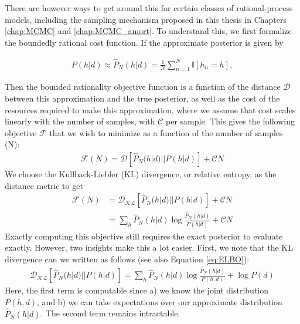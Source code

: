 There are however ways to get around this for certain classes of rational-process models, including the sampling mechanism proposed in this thesis in Chapters \ref{chap:MCMC} and \ref{chap:MCMC_amort}. To understand this, we first formalize the boundedly rational cost function. If the approximate posterior is given by

\begin{align}
P(h|d) \approx \hat{P}_N(h|d) = \frac{1}{N}\sum_{n=1}^N \mathbb{I}[h_n=h],
\end{align}

Then the bounded rationality objective function is a function of the distance $\mathcal{D}$ between this approximation and the true posterior, as well as the cost of the resources required to make this approximation, where we assume that cost scales linearly with the number of samples, with $\mathcal{C}$ per sample. This gives the following objective $\mathcal{F}$ that we wish to minimize as a function of the number of samples (N):
\begin{align}
\mathcal{F}(N) = \mathcal{D}[\hat{P}_N(h|d)||P(h|d)] + \mathcal{C}N
\end{align}
We choose the Kullback-Liebler (KL) divergence, or relative entropy, as the distance metric to get
\begin{align}
\mathcal{F}(N) &= \mathcal{D_{KL}}[\hat{P}_N(h|d)||P(h|d)] + \mathcal{C}N \\
& =  \sum_h \hat{P}_N(h|d) \log \frac{\hat{P}_N(h|d)}{P(h|d)} + \mathcal{C}N
\end{align}
Exactly computing this objective still requires the exact posterior to evaluate exactly. However, two insights make this a lot easier. First, we note that the KL divergence can we written as follows (see also Equation \ref{eq:ELBO}):
\begin{align}
\mathcal{D_{KL}}[\hat{P}_N(h|d)||P(h|d)]  = \sum_h \hat{P}_N(h|d) \log \frac{\hat{P}_N(h|d)}{P(h,d)} + \log P(d)
\label{eq:split_KL}
\end{align}
Here, the first term is computable since a) we know the joint distribution $P(h,d)$,  and b) we can take expectations over our approximate distribution $\hat{P}_N(h|d)$. The second term remains intractable. 


